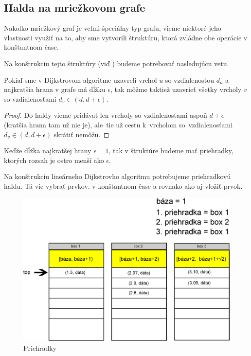 \subsection{Halda na mriežkovom grafe}
Nakoľko mriežkový graf je veľmi špeciálny typ grafu,
vieme niektoré jeho vlastnosti využiť na to, aby sme vytvorili štruktúru, ktorá zvládne obe operácie v konštantnom čase. 


Na konštrukciu tejto štruktúry (viď \cite{gs97}) budeme potrebovať nasledujúcu vetu.

\begin{theorem}
Pokiaľ sme v Dijkstrovom algoritme uzavreli vrchol $u$ so vzdialenosťou $d_u$ a najkratšia hrana v grafe má dĺžku $\epsilon$, tak môžme taktiež 
uzavrieť všetky vrcholy $v$ so vzdialenosťami $d_v \in (d, d + \epsilon)$.
\end{theorem}
\begin{proof}
Do haldy vieme pridávať len vrcholy so vzdialenosťami aspoň $d + \epsilon$ (kratšia hrana tam už nie je), 
ale~tie už cestu k~vrcholom so~vzdialenosťami
$d_v \in (d, d + \epsilon)$ skrátiť nemôžu.
\end{proof}


Keďže dĺžka najkratšej hrany $\epsilon = 1$, tak v štruktúre budeme mať priehradky, ktorých rozsah je ostro menší ako $\epsilon$. 



Na konštrukciu lineárneho Dijkstrovho algoritmu potrebujeme priehradkovú haldu. Tá vie vybrať   prvkov.
v konštantnom čase a rovnako ako aj vložiť prvok.

\begin{figure}[h]
\centering
\includegraphics[width=\textwidth]{./img/priehradky_naplnene_default.eps}
\caption{Priehradky}
\label{fig:priehradky}
\end{figure}


